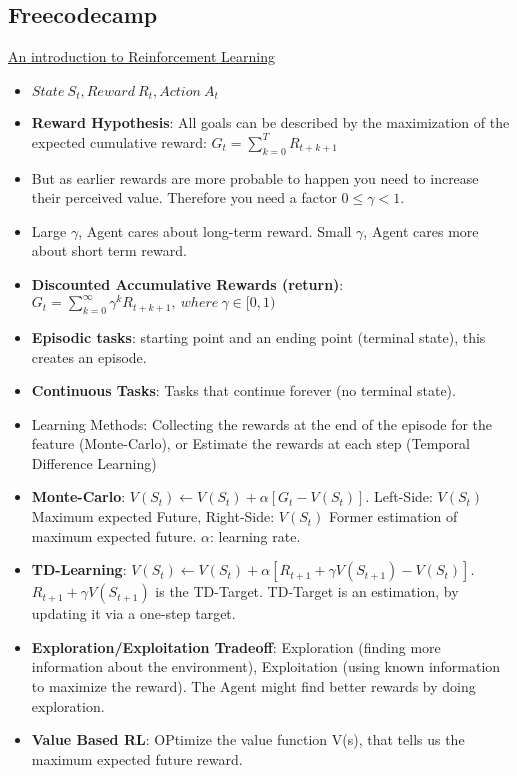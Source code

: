 \subsection{Freecodecamp}
\href{https://www.freecodecamp.org/news/an-introduction-to-reinforcement-learning-4339519de419/}{An introduction to Reinforcement Learning}
\begin{itemize}[noitemsep,nolistsep]
	\item $State\ S_t, Reward\ R_t, Action\ A_t$
	\item \textbf{Reward Hypothesis}: All goals can be described by the maximization of the expected cumulative reward: $G_t = \sum_{k=0}^T R_{t+k+1}$
	\item But as earlier rewards are more probable to happen you need to increase their perceived value. Therefore you need a factor $0 \leq \gamma < 1$.
	\item Large $\gamma$, Agent cares about long-term reward. Small $\gamma$, Agent cares more about short term reward.
	\item \textbf{Discounted Accumulative Rewards (return)}: $G_t = \sum_{k=0}^\infty \gamma^k R_{t+k+1},\ where\ \gamma \in [0,1)$ 
	\item \textbf{Episodic tasks}: starting point and an ending point (terminal state), this creates an episode.
	\item \textbf{Continuous Tasks}: Tasks that continue forever (no terminal state).
	\item Learning Methods: Collecting the rewards at the end of the episode for the feature (Monte-Carlo), or Estimate the rewards at each step (Temporal Difference Learning)
	\item \textbf{Monte-Carlo}: $V(S_t) \leftarrow V(S_t) + \alpha [G_t - V(S_t)]$. Left-Side: $V(S_t)$ Maximum expected Future, Right-Side: $V(S_t)$ Former estimation of maximum expected future. $\alpha$: learning rate.
	\item \textbf{TD-Learning}: $V(S_t) \leftarrow V(S_t) + \alpha [R_{t+1} + \gamma V(S_{t+1}) - V(S_t)]$. $R_{t+1} + \gamma V(S_{t+1})$ is the TD-Target. TD-Target is an estimation, by updating it via a one-step target.
	\item \textbf{Exploration/Exploitation Tradeoff}: Exploration (finding more information about the environment), Exploitation (using known information to maximize the reward). The Agent might find better rewards by doing exploration.
	\item \textbf{Value Based RL}: OPtimize the value function V(s), that tells us the maximum expected future reward.

\end{itemize}
